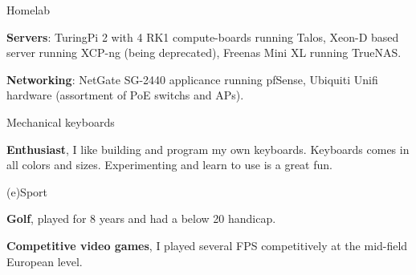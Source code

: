

\begin{cventries}

  \cventry
    {Homelab} %
    {} %
    {} %
    {} %
    {
      \begin{cvitems} %
        \item {\textbf{Servers}: TuringPi 2 with 4 RK1 compute-boards running Talos, Xeon-D based server running XCP-ng (being deprecated), Freenas Mini XL running TrueNAS.}
        \item {\textbf{Networking}: NetGate SG-2440 applicance running pfSense, Ubiquiti Unifi hardware (assortment of PoE switchs and APs).}
      \end{cvitems}
    }

  \cventry
    {Mechanical keyboards} %
    {} %
    {} %
    {} %
    {
      \begin{cvitems} %
        \item {\textbf{Enthusiast}, I like building and program my own keyboards. Keyboards comes in all colors and sizes. Experimenting and learn to use is a great fun.}
      \end{cvitems}
    }

  \cventry
    {(e)Sport} %
    {} %
    {} %
    {} %
    {
      \begin{cvitems} %
        \item {\textbf{Golf}, played for 8 years and had a below 20 handicap.}
        \item {\textbf{Competitive video games}, I played several FPS competitively at the mid-field European level.}
      \end{cvitems}
    }

\end{cventries}
